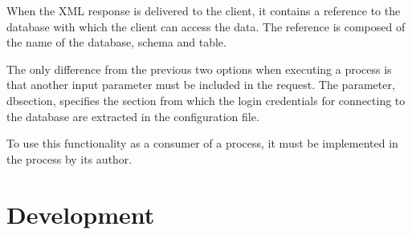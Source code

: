 \begin{itemize}
When the XML response is delivered to the client, it contains a reference to the database with which the client can access the data. The reference is composed of the name of the database, schema and table. 

The only difference from the previous two options when executing a process is that another input parameter must be included in the request. The parameter, db\textunderscore section, specifies the section from which the login credentials for connecting to the database are extracted in the configuration file.

To use this functionality as a consumer of a process, it must be implemented in the process by its author. 


\end{itemize}



\section{Development} 

